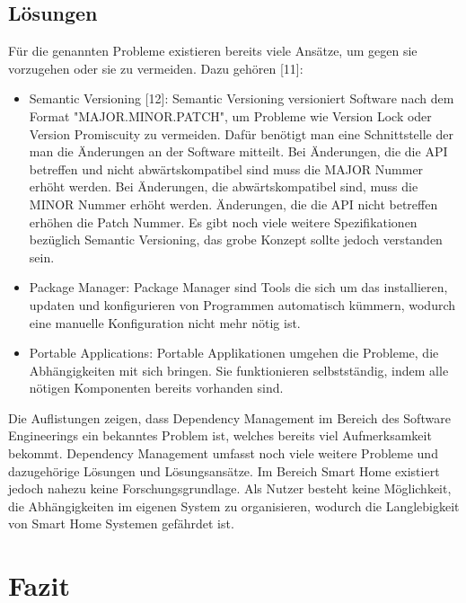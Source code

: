 \subsection{Lösungen}
Für die genannten Probleme existieren bereits viele Ansätze, um gegen sie vorzugehen oder sie zu vermeiden. Dazu gehören [11]:
\begin{itemize}
 \item Semantic Versioning [12]: Semantic Versioning versioniert Software nach dem Format "MAJOR.MINOR.PATCH", um Probleme wie Version Lock 
oder Version Promiscuity zu vermeiden. Dafür benötigt 
man eine Schnittstelle der man die Änderungen an der Software mitteilt. Bei Änderungen, die die API betreffen und nicht abwärtskompatibel
sind muss die MAJOR Nummer erhöht werden. Bei Änderungen, die abwärtskompatibel sind, muss die MINOR Nummer erhöht werden. 
Änderungen, die die API nicht betreffen erhöhen die Patch Nummer. Es gibt noch viele weitere Spezifikationen bezüglich Semantic
Versioning, das grobe Konzept sollte jedoch verstanden sein. 
\item Package Manager: Package Manager sind Tools die sich um das installieren, updaten und konfigurieren von Programmen automatisch
kümmern, wodurch eine manuelle Konfiguration nicht mehr nötig ist.
\item Portable Applications: Portable Applikationen umgehen die Probleme, die
Abhängigkeiten mit sich bringen. Sie funktionieren selbstständig,
indem alle nötigen Komponenten bereits vorhanden sind.
\end{itemize}

Die Auflistungen zeigen, dass Dependency Management im Bereich des Software Engineerings ein bekanntes Problem ist, welches
bereits viel Aufmerksamkeit bekommt. Dependency Management umfasst noch viele weitere Probleme und dazugehörige Lösungen und Lösungsansätze.
Im Bereich Smart Home existiert jedoch nahezu keine Forschungsgrundlage. Als Nutzer besteht keine Möglichkeit, die
Abhängigkeiten im eigenen System zu organisieren, wodurch die Langlebigkeit von Smart Home Systemen gefährdet ist. 


\section{Fazit}

